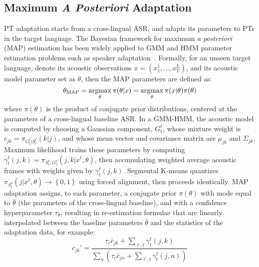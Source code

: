 \subsection{Maximum {\em A Posteriori} Adaptation}
\label{sec:adaptation}

PT adaptation starts from a cross-lingual ASR,
and adapts its parameters to PTs in the target language.  The
Bayesian framework for maximum {\em a posteriori} (MAP) estimation
has been widely applied to GMM and HMM parameter estimation problems
such as speaker adaptation~\cite{gauvain1994maximum}.
Formally, for an unseen target language, denote its acoustic
observations $x = ( x_1^1, \ldots, x_{T}^L )$, and its acoustic model
parameter set as $\theta$, then the MAP parameters are defined as:
\begin{equation}
  \theta_{\mathrm{MAP}}  = \argmax_{\theta} \pi(\theta | x) 
= \argmax_{\theta} \pi( x | \theta ) \pi(\theta)
\label{eq:map}
\end{equation}
\noindent where $\pi(\theta)$ is the product of conjugate
prior distributions, centered at the parameters of a cross-lingual
baseline ASR.  In a GMM-HMM, the acoustic model 
is computed by choosing a Gaussian component, $G_t^\ell$, whose mixture
weight is $c_{jk}=\pi_{G_t^{\ell}|S_t^{\ell}}(k|j)$, and whose mean vector
and covariance matrix are $\mu_{jk}$ and $\Sigma_{jk}$.  Maximum
likelihood trains these parameters by computing
$\gamma^{\ell}_t(j,k)=\pi_{S_t^{\ell},G_t^{\ell}}(j,k|x^\ell,\theta)$,
then accumulating weighted average acoustic frames with weights given
by $\gamma_{t}^\ell(j,k)$. Segmental K-means quantizes
$\pi_{S_t^\ell}(j|x^\ell,\theta)\rightarrow\left\{0,1\right\}$ using forced
alignment, then proceeds identically.  MAP adaptation assigns, to each
parameter, a conjugate prior $\pi(\theta)$ with mode equal to
$\bar\theta$ (the parameters of the cross-lingual baseline), and with a
confidence hyperparameter $\tau_\theta$, resulting in re-estimation
formulae that are linearly interpolated between the baseline
parameters $\bar\theta$ and the statistics of the adaptation data, for
example:
\begin{equation}
c_{jk}'=\frac{\tau_c\bar{c}_{jk}+\sum_{\ell,t}\gamma_{t}^\ell(j,k)}
{\sum_{n}\left(\tau_c\bar{c}_{jn}+
  \sum_{\ell,t}\gamma_{t}^\ell(j,n)\right)}
\end{equation}


